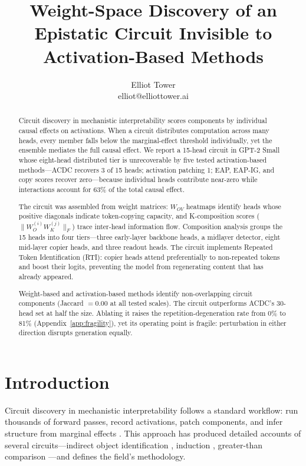 \documentclass{article}
\title{Weight-Space Discovery of an Epistatic Circuit Invisible to Activation-Based Methods}
\author{\name Elliot Tower \\
      \email elliot@elliottower.ai}
\begin{document}
\maketitle

\begin{abstract}
Circuit discovery in mechanistic interpretability scores components by
individual causal effects on activations. When a circuit distributes
computation across many heads, every member falls below the
marginal-effect threshold individually, yet the ensemble mediates the
full causal effect. We report a 15-head circuit in GPT-2 Small whose
eight-head distributed tier is unrecoverable by five tested
activation-based methods---ACDC recovers 3 of 15 heads; activation
patching 1; EAP, EAP-IG, and copy scores recover zero---because
individual heads contribute near-zero while interactions account for
63\% of the total causal effect.

The circuit was assembled from weight matrices: $W_{OV}$ heatmaps
identify heads whose positive diagonals indicate token-copying capacity,
and K-composition scores ($\|W_O^{(i)} W_K^{(j)}\|_F$) trace inter-head
information flow. Composition analysis groups the 15 heads into four
tiers---three early-layer backbone heads, a midlayer detector, eight
mid-layer copier heads, and three readout heads. The circuit implements
Repeated Token Identification (RTI): copier heads attend preferentially
to non-repeated tokens and boost their logits, preventing the model
from regenerating content that has already appeared.

Weight-based and activation-based methods identify non-overlapping
circuit components (Jaccard $= 0.00$ at all tested scales).
The circuit outperforms ACDC's 30-head set at half the size. Ablating
it raises the repetition-degeneration rate from 0\% to 81\%
(Appendix~\ref{app:fragility}), yet its operating point is fragile:
perturbation in either direction disrupts generation equally.
\end{abstract}


\section{Introduction}
\label{sec:intro}

Circuit discovery in mechanistic interpretability follows a standard
workflow: run thousands of forward passes, record activations, patch
components, and infer structure from marginal effects
\citep{conmy2023acdc, goldowsky-dill2023localizing, syed2023eap}.
This approach has produced detailed accounts of several circuits---indirect
object identification \citep{wang2023ioi}, induction \citep{olsson2022icl},
greater-than comparison \citep{hanna2023gt}---and defines the field's
methodology.
\end{document}
